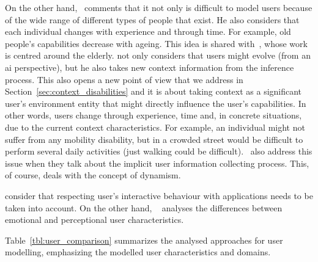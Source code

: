 On the other hand,~\citet{fischer_user_2001} comments that it not only is 
difficult to model users because of the wide range of different types of people 
that exist. He also considers that each individual changes with experience and 
through time. For example, old people's capabilities decrease with ageing. This
idea is shared with~\citet{gregor_designing_2002}, whose work is centred around
the elderly. \citet{heckmann_ubiquitous_2005} not only considers that users 
might evolve (from an \ac{ai} perspective), but he also takes new context 
information from the inference process. This also opens a new point of view 
that we address in Section~\ref{sec:context_disabilities} and it is about taking 
context as a significant user's environment entity that might directly influence 
the user's capabilities. In other words, users change through experience, time 
and, in concrete situations, due to the current context characteristics. For 
example, an individual might not suffer from any mobility disability, but in a 
crowded street would be difficult to perform several daily activities (just 
walking could be difficult).~\citet{razmerita_ontology_based_2003} also address 
this issue when they talk about the implicit user information collecting 
process. This, of course, deals with the concept of dynamism.

\citet{evers_achieving_2012} consider that respecting user's interactive 
behaviour with applications needs to be taken into account. On the other hand,
~\citet{pereira_triple_2005} analyses the differences between emotional and
perceptional user characteristics. 


Table~\ref{tbl:user_comparison} summarizes the analysed approaches for user
modelling, emphasizing the modelled user characteristics and domains. 



